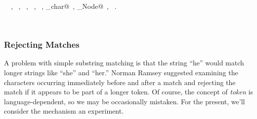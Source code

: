 \documentclass{report}
\begin{document}
\begin{flushleft}
\begin{minipage}{\linewidth}
\vspace{-2ex}
\footnotesize\addtolength{\baselineskip}{-1ex}
\begin{list}{}{\setlength{\itemsep}{-\parsep}\setlength{\itemindent}{-\leftmargin}}
\item \NWtxtIdentsUsed\nobreak\  \verb@FALSE@\nobreak\ , \verb@first@\nobreak\ , \verb@fprintf@\nobreak\ , \verb@fputs@\nobreak\ , \verb@Name@\nobreak\ , \verb@nw_char@\nobreak\ , \verb@Scrap_Node@\nobreak\ , \verb@TRUE@\nobreak\ .\end{list}
\end{minipage}\\[4ex]
\end{flushleft}
\subsubsection{Rejecting Matches}

A problem with simple substring matching is that the string ``he''
would match longer strings like ``she'' and ``her.'' Norman Ramsey
suggested examining the characters occurring immediately before and
after a match and rejecting the match if it appears to be part of a
longer token. Of course, the concept of {\sl token\/} is
language-dependent, so we may be occasionally mistaken.
For the present, we'll consider the mechanism an experiment.
\end{document}
